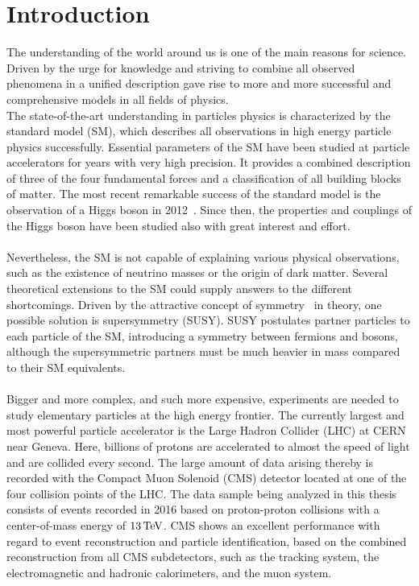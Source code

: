 \chapter{Introduction}\label{chap:intro}

The understanding of the world around us is one of the main reasons for science. Driven by the urge for knowledge and striving to combine all observed phenomena in a unified description gave rise to more and more successful and comprehensive models in all fields of physics.\\
The state-of-the-art understanding in particles physics is characterized by the standard model (SM), which describes all observations in high energy particle physics successfully. Essential parameters of the SM have been studied at particle accelerators for years with very high precision. It provides a combined description of three of the four fundamental forces and a classification of all building blocks of matter. The most recent remarkable success of the standard model is the observation of a Higgs boson in 2012~\cite{HiggsCMS,HiggsATLAS,HiggsCombined}. Since then, the properties and couplings of the Higgs boson have been studied also with great interest and effort.\\\\
Nevertheless, the SM is not capable of explaining various physical observations, such as the existence of neutrino masses or the origin of dark matter. Several theoretical extensions to the SM could supply answers to the different shortcomings. Driven by the attractive concept of symmetry~\cite{Noether} in theory, one possible solution is supersymmetry (SUSY). SUSY postulates partner particles to each particle of the SM, introducing a symmetry between fermions and bosons, although the supersymmetric partners must be much heavier in mass compared to their SM equivalents.\\\\
Bigger and more complex, and such more expensive, experiments are needed to study elementary particles at the high energy frontier. The currently largest and most powerful particle accelerator is the Large Hadron Collider (LHC) at CERN near Geneva. Here, billions of protons are accelerated to almost the speed of light and are collided every second. The large amount of data arising thereby is recorded with the Compact Muon Solenoid (CMS) detector located at one of the four collision points of the LHC. The data sample being analyzed in this thesis consists of events recorded in 2016 based on proton-proton collisions with a center-of-mass energy of $13\,\text{Te\hspace{-.08em}V}$. CMS shows an excellent performance with regard to event reconstruction and particle identification, based on the combined reconstruction from all CMS subdetectors, such as the tracking system, the electromagnetic and hadronic calorimeters, and the muon system.\\\\\\

